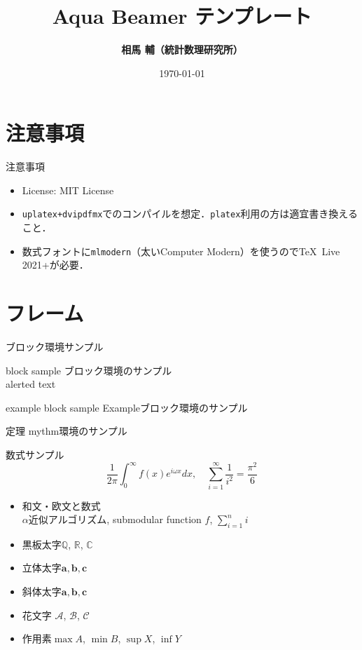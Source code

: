 \documentclass[14pt,aspectratio=169,xcolor=dvipsnames,table,dvipdfmx]{beamer}
\title{Aqua Beamer テンプレート}
\author{\textbf{相馬 輔（統計数理研究所）}}
\date{\today}
\institute{ほげほげ研究室}
\theoremstyle{definition}
\newenvironment{mythm}{\begin{alertblock}{定理}}{\end{alertblock}} %
\begin{document}
\maketitle
\frame{\tableofcontents[hideallsubsections]}

\section{注意事項}
\begin{frame}{注意事項}
\begin{itemize}
\item License: MIT License
\item \texttt{uplatex+dvipdfmx}でのコンパイルを想定．\texttt{platex}利用の方は適宜書き換えること．
\item 数式フォントに\texttt{mlmodern}（太いComputer Modern）を使うので\TeX~Live 2021+が必要．
\end{itemize}
\end{frame}

\section{フレーム}
\begin{frame}{ブロック環境サンプル}
    \begin{block}{block sample}
        ブロック環境のサンプル\\
        \alert{alerted text}
    \end{block} 
    \vfill
    \begin{exampleblock}{example block sample}
        Exampleブロック環境のサンプル
    \end{exampleblock} 
    \vfill
    \begin{mythm}
        mythm環境のサンプル
    \end{mythm} 
\end{frame}

\begin{frame}{数式サンプル}
    \[
       \frac{1}{2\pi} \int_0^\infty f(x)e^{i\omega x} dx, \quad
       \sum_{i=1}^\infty \frac{1}{i^2} = \frac{\pi^2}{6}
    \]

    \begin{itemize}
        \item 和文・欧文と数式 \\ 
         $\alpha$近似アルゴリズム, submodular function $f$, $\sum_{i=1}^n i$
        \item 黒板太字$\mathbb{Q}$, $\mathbb{R}$, $\mathbb{C}$
        \item 立体太字$\mathbf{a}, \mathbf{b}, \mathbf{c}$
        \item 斜体太字$\boldsymbol{a}, \boldsymbol{b}, \boldsymbol{c}$
        \item 花文字 $\mathcal{A}$, $\mathcal{B}$, $\mathcal{C}$
        \item 作用素$\max A$, $\min B$, $\sup X$, $\inf Y$
    \end{itemize}
\end{frame}
\end{document}
